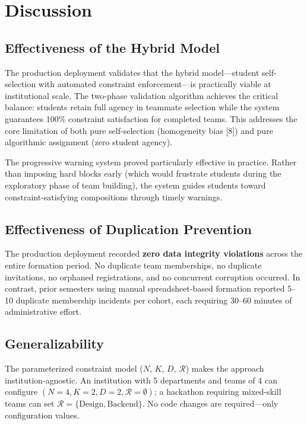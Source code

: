 \documentclass[12pt,a4paper]{article}
\begin{document}
\section{Discussion}

\subsection{Effectiveness of the Hybrid Model}

The production deployment validates that the hybrid model---student self-selection with automated constraint enforcement---is practically viable at institutional scale. The two-phase validation algorithm achieves the critical balance: students retain full agency in teammate selection while the system guarantees 100\% constraint satisfaction for completed teams. This addresses the core limitation of both pure self-selection (homogeneity bias [8]) and pure algorithmic assignment (zero student agency).

The progressive warning system proved particularly effective in practice. Rather than imposing hard blocks early (which would frustrate students during the exploratory phase of team building), the system guides students toward constraint-satisfying compositions through timely warnings.

\subsection{Effectiveness of Duplication Prevention}

The production deployment recorded \textbf{zero data integrity violations} across the entire formation period. No duplicate team memberships, no duplicate invitations, no orphaned registrations, and no concurrent corruption occurred. In contrast, prior semesters using manual spreadsheet-based formation reported 5--10 duplicate membership incidents per cohort, each requiring 30--60 minutes of administrative effort.

\subsection{Generalizability}

The parameterized constraint model ($N$, $K$, $D$, $\mathcal{R}$) makes the approach institution-agnostic. An institution with 5 departments and teams of 4 can configure $(N=4, K=2, D=2, \mathcal{R}=\emptyset)$; a hackathon requiring mixed-skill teams can set $\mathcal{R} = \{\text{Design}, \text{Backend}\}$. No code changes are required---only configuration values.
\end{document}

